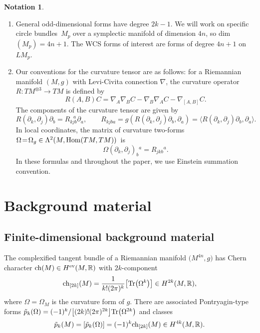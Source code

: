 \documentclass[10pt,a4paper]{amsart}
\numberwithin{equation}{section}
\theoremstyle{definition}
\newtheorem*{Notation}{Notation}
\newcommand{\BbR}{{\mathbb R}}
\newcommand{\R}{\BbR}
\newcommand{\Tr}{{\rm Tr}}
\newcommand{\br}{ R}
\newcommand{\tp}{\tilde p}
\begin{document}
\begin{Notation}\quad
\begin{enumerate}\itemsep=0pt
\item[(i)] General odd-dimensional forms have degree
$2k-1$. We will work on specific circle bundles~$M_p$ over a symplectic manifold of dimension $4n$, so dim$(M_p) = 4n+1$. The WCS forms of interest are forms of degree $4n+1$ on $LM_p$.

\item[(ii)] Our conventions for the curvature tensor are as follows: for a Riemannian manifold $(M,g)$ with Levi-Civita connection $\nabla$, the curvature operator $R\colon TM^{\otimes 3} \to TM$ is defined by
\[R(A, B) C = \nabla_{A} \nabla_{B} C - \nabla_{B} \nabla_{A} C - \nabla_{[A,B]} C.\]
The components of the curvature tensor are given by
\begin{equation}\label{curvconv}\br(\partial_k, \partial_j)\partial_b = \br_{kjb}^{\ \ \ a}\partial_a,\qquad
\br_{kjba} = g(\br(\partial_k,\partial_j)\partial_b,\partial_a) =
\langle \br(\partial_k,\partial_j)\partial_b,\partial_a\rangle.
\end{equation}
In local coordinates, the matrix of curvature two-forms $\Omega \!=\! \Omega_g\in \Lambda^2(M, {\rm Hom}(TM,TM))$~is%
\begin{equation}\label{eq:cc}\Omega(\partial_k,\partial_j)_b{}^a = R_{jkb}{}^a.
\end{equation}
In these formulas and throughout the paper, we use Einstein summation convention.
\end{enumerate}
\end{Notation}

\section{Background material}\label{section2}
\subsection{Finite-dimensional background material}%
The complexified tangent bundle
of a Riemannian manifold $\bigl(M^{4n},g\bigr)$ has Chern character
${\rm ch}(M) \in H^{{\rm ev}}(M,\R)$
with $2k$-component
\begin{equation}\label{onea}{\rm ch}_{[2k]}(M) = \frac{1}{k!(2\pi)^k}\bigl[\Tr\bigl(\Omega^k\bigr)\bigr]\in H^{2k}(M,\R),
\end{equation}
where $\Omega = \Omega_M$ is the curvature form of $g$. There are associated Pontryagin-type forms
$\tp_k(\Omega) = \smash{(-1)^k/\bigl[(2k)!(2\pi)^{2k}\bigr]\Tr\bigl(\Omega^{2k}\bigr)}$ and classes
\[\tp_{k}(M)= [ \tp_k(\Omega)] = (-1)^k {\rm ch}_{[2k]}(M)\in H^{4k}(M,\R).\]
\end{document}
